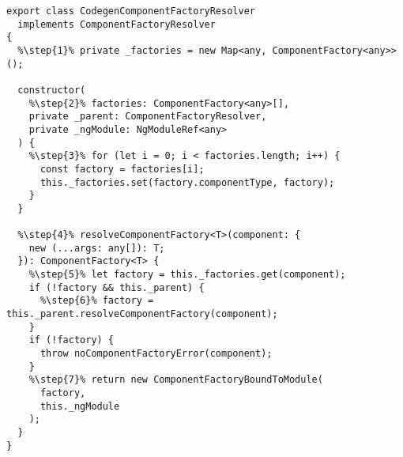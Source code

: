 \begin{verbatim}
export class CodegenComponentFactoryResolver
  implements ComponentFactoryResolver
{
  %\step{1}% private _factories = new Map<any, ComponentFactory<any>>();

  constructor(
    %\step{2}% factories: ComponentFactory<any>[],
    private _parent: ComponentFactoryResolver,
    private _ngModule: NgModuleRef<any>
  ) {
    %\step{3}% for (let i = 0; i < factories.length; i++) {
      const factory = factories[i];
      this._factories.set(factory.componentType, factory);
    }
  }

  %\step{4}% resolveComponentFactory<T>(component: {
    new (...args: any[]): T;
  }): ComponentFactory<T> {
    %\step{5}% let factory = this._factories.get(component);
    if (!factory && this._parent) {
      %\step{6}% factory = this._parent.resolveComponentFactory(component);
    }
    if (!factory) {
      throw noComponentFactoryError(component);
    }
    %\step{7}% return new ComponentFactoryBoundToModule(
      factory,
      this._ngModule
    );
  }
}
\end{verbatim}
